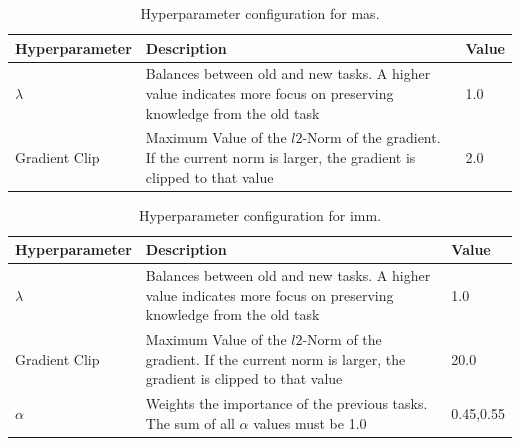 \begin{table}[!htb]
    \begin{tabularx}{\textwidth}{| l | X | l |} 
        \hline
        Hyperparameter & Description & Value \\ 
        \hline 
        \hline
        $\lambda$ & Balances between old and new tasks. A higher value indicates more focus
        on preserving knowledge \newline from the old task & 1.0  \\ 
        \hline
        Gradient Clip & Maximum Value of the $l2$-Norm of the gradient. If the current norm is larger, the
        gradient is clipped to that value & 2.0 \\ 
        \hline
    \end{tabularx}
    \caption{Hyperparameter configuration for \gls{mas}.}
    \label{fig:MASparams}
\end{table}

\begin{table}[!htb]
    \begin{tabularx}{\textwidth}{| l | X | l |} 
        \hline
        Hyperparameter & Description & Value \\ 
        \hline 
        \hline
        $\lambda$ & Balances between old and new tasks. A higher value indicates more focus
        on preserving knowledge from the old task & 1.0  \\ 
        \hline
        Gradient Clip & Maximum Value of the $l2$-Norm of the gradient. If the current norm is larger, the
        gradient is clipped to that value & 20.0 \\ 
        \hline
        $\alpha$ & Weights the importance of the previous tasks. The sum of all $\alpha$ values must be 1.0 & 0.45,0.55 \\
        \hline
    \end{tabularx}
    \caption{Hyperparameter configuration for \gls{imm}.}
    \label{fig:IMMparams}
\end{table}

